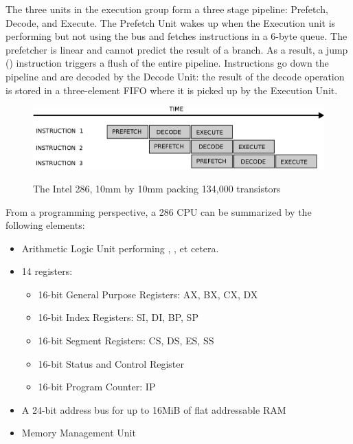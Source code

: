 \documentclass[book.tex]{subfiles}
\begin{document}
\par
The three units in the execution group form a three stage pipeline: Prefetch, Decode, and Execute. The Prefetch Unit wakes up when the Execution unit is performing but not using the bus and fetches instructions in a 6-byte queue. The prefetcher is linear and cannot predict the result of a branch. As a result, a jump () instruction triggers a flush of the entire pipeline. Instructions go down the pipeline and are decoded by the Decode Unit: the result of the decode operation is stored in a three-element FIFO where it is picked up by the Execution Unit.\\
\par

\begin{figure}[H]
\centering
\includegraphics[width=\textwidth]{imgs/drawings/instruction_pipeline.eps}\\
\end{figure}
\par
\begin{figure}[H]
\centering

\caption{The Intel 286, 10mm by 10mm packing 134,000 transistors}
\end{figure}
\par
From a programming perspective, a 286 CPU can be summarized by the following elements:
\begin{itemize}
\item Arithmetic Logic Unit performing , ,  et cetera.
\item 14 registers:
\begin{itemize}
  \item 16-bit General Purpose Registers: AX, BX, CX, DX
  \item 16-bit Index Registers: SI, DI, BP, SP
  \item 16-bit Segment Registers: CS, DS, ES, SS
  \item 16-bit Status and Control Register
  \item 16-bit Program Counter: IP
\end{itemize}
\item A 24-bit address bus for up to 16MiB of flat addressable RAM
\item Memory Management Unit
\end{itemize}
 \par
\end{document}
